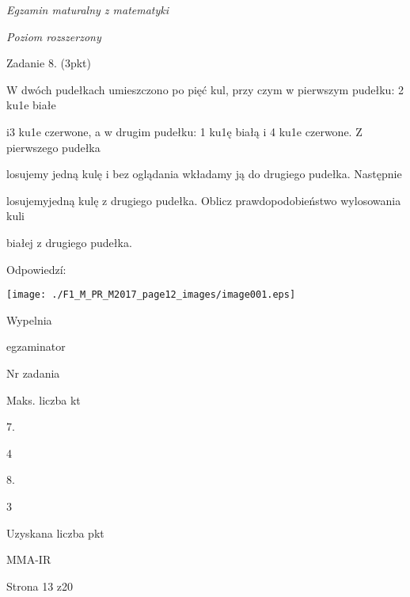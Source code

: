 \documentclass[a4paper,12pt]{article}
\begin{document}
{\it Egzamin maturalny z matematyki}

{\it Poziom rozszerzony}

Zadanie 8. (3pkt)

W dwóch pudełkach umieszczono po pięć kul, przy czym w pierwszym pudełku: 2 ku1e białe

i3 ku1e czerwone, a w drugim pudełku: 1 ku1ę białą i 4 ku1e czerwone. Z pierwszego pudełka

losujemy jedną kulę i bez oglądania wkładamy ją do drugiego pudełka. Następnie

losujemyjedną kulę z drugiego pudełka. Oblicz prawdopodobieństwo wylosowania kuli

białej z drugiego pudełka.

Odpowiedzí:
\begin{center}
\texttt{[image: ./F1\_M\_PR\_M2017\_page12\_images/image001.eps]}
\end{center}
Wypelnia

egzaminator

Nr zadania

Maks. liczba kt

7.

4

8.

3

Uzyskana liczba pkt

MMA-IR

Strona 13 z20
\end{document}

